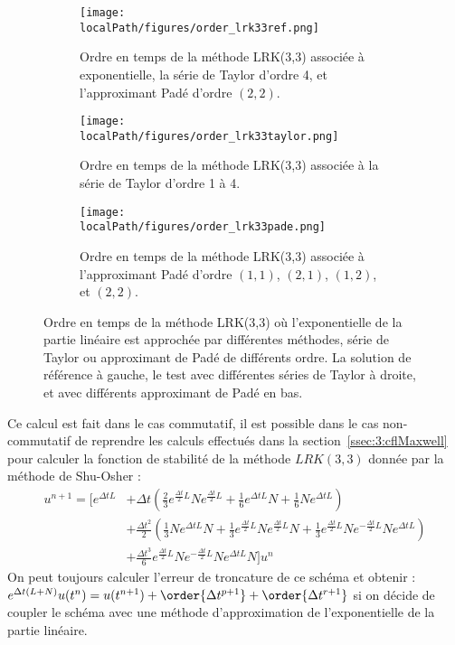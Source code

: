 
\begin{figure}
  \centering
  \begin{subfigure}{.45\textwidth}
    \centering
    \texttt{[image: \\localPath/figures/order\_lrk33ref.png]}
    \caption{Ordre en temps de la méthode LRK(3,3) associée à exponentielle, la série de Taylor d'ordre 4, et l'approximant Padé d'ordre $(2,2)$.}
    \label{fig:lrk33ref}
  \end{subfigure}
  \begin{subfigure}{.45\textwidth}
    \centering
    \texttt{[image: \\localPath/figures/order\_lrk33taylor.png]}
    \caption{Ordre en temps de la méthode LRK(3,3) associée à la série de Taylor d'ordre 1 à 4.\\ }
    \label{fig:lrk33taylor}
  \end{subfigure}
  \begin{subfigure}{.45\textwidth}
    \centering
    \texttt{[image: \\localPath/figures/order\_lrk33pade.png]}
    \caption{Ordre en temps de la méthode LRK(3,3) associée à l'approximant Padé d'ordre $(1,1)$, $(2,1)$, $(1,2)$, et $(2,2)$.}
    \label{fig:lrk33pade}
  \end{subfigure}
  \caption{Ordre en temps de la méthode LRK(3,3) où l'exponentielle de la partie linéaire est approchée par différentes méthodes, série de Taylor ou approximant de Padé de différents ordre. La solution de référence à gauche, le test avec différentes séries de Taylor à droite, et avec différents approximant de Padé en bas.}
  \label{fig:3:order}
\end{figure}

Ce calcul est fait dans le cas commutatif, il est possible dans le cas non-commutatif de reprendre les calculs effectués dans la section~\ref{ssec:3:cflMaxwell} pour calculer la fonction de stabilité de la méthode $LRK(3,3)$ donnée par la méthode de Shu-Osher :
$$
  \begin{aligned}
    u^{n+1} = \Big[ e^{\Delta tL} &+ \Delta t\left(\frac{2}{3}e^{\frac{\Delta t}{2}L}Ne^{\frac{\Delta t}{2}L}+\frac{1}{6}e^{\Delta tL}N + \frac{1}{6}Ne^{\Delta tL}\right) \\
    & + \frac{\Delta t^2}{2}\left(\frac{1}{3}Ne^{\Delta tL}N + \frac{1}{3}e^{\frac{\Delta t}{2}L}Ne^{\frac{\Delta t}{2}L}N + \frac{1}{3} e^{\frac{\Delta t}{2}L}Ne^{-\frac{\Delta t}{2}L}Ne^{\Delta tL} \right) \\
    & + \frac{\Delta t^3}{6}e^{\frac{\Delta t}{2}L}Ne^{-\frac{\Delta t}{2}L}Ne^{\Delta tL}N \Big]u^n
  \end{aligned}
$$
On peut toujours calculer l'erreur de troncature de ce schéma et obtenir : $e^{\Delta t(L+N)}u(t^n) = u(t^{n+1})+\order{\Delta t^{p+1}}+\order{\Delta t^{r+1}}$ si on décide de coupler le schéma avec une méthode d'approximation de l'exponentielle de la partie linéaire.

